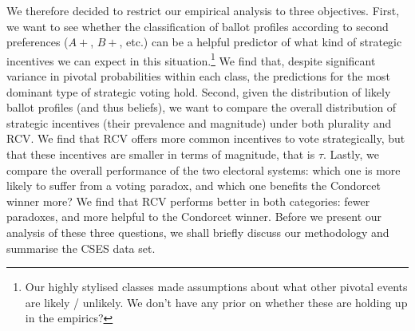 \documentclass[11pt, letter]{article}
\begin{document}
We therefore decided to restrict our empirical analysis to three objectives. First, we want to see whether the classification of ballot profiles according to second preferences ($A+$, $B+$, etc.) can be a helpful predictor of what kind of strategic incentives we can expect in this situation.\footnote{Our highly stylised classes made assumptions about what other pivotal events are likely / unlikely. We don't have any prior on whether these are holding up in the empirics?} We find that, despite significant variance in pivotal probabilities within each class, the predictions for the most dominant type of strategic voting hold. Second, given the distribution of likely ballot profiles (and thus beliefs), we want to compare the overall distribution of strategic incentives (their prevalence and magnitude) under both plurality and RCV. We find that RCV offers more common incentives to vote strategically, but that these incentives are smaller in terms of magnitude, that is $\tau$. Lastly, we compare the overall performance of the two electoral systems: which one is more likely to suffer from a voting paradox, and which one benefits the Condorcet winner more? We find that RCV performs better in both categories: fewer paradoxes, and more helpful to the Condorcet winner. Before we present our analysis of these three questions, we shall briefly discuss our methodology and summarise the CSES data set.




\end{document}
